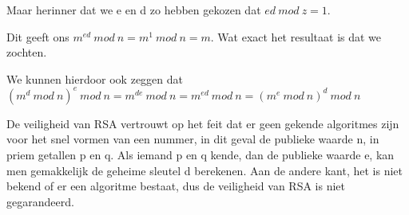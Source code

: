 \noindent Maar herinner dat we e en d zo hebben gekozen dat $ed\ mod\ z = 1$. 

\noindent Dit geeft ons $m^{ed}\ mod\ n = m^1\ mod\ n = m$. Wat exact het resultaat is dat we zochten. 

\noindent We kunnen hierdoor ook zeggen dat $(m^d\ mod\ n)^e\ mod\ n = m^{de}\ mod\ n = m^{ed}\ mod\ n = (m^e\ mod\ n)^d\ mod\ n$

\noindent De veiligheid van RSA vertrouwt op het feit dat er geen gekende algoritmes zijn voor het snel vormen van een nummer, in dit geval de publieke waarde n, in priem getallen p en q. Als iemand p en q kende, dan de publieke waarde e, kan men gemakkelijk de geheime sleutel d berekenen.
Aan de andere kant, het is niet bekend of er een algoritme bestaat, dus de veiligheid van RSA is niet gegarandeerd.
